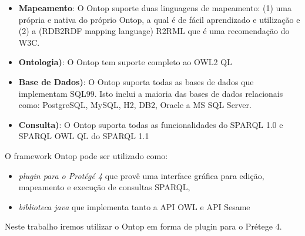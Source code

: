 \begin{itemize}

    \item \textbf{Mapeamento}: O Ontop suporte duas linguagens de mapeamento:
    (1) uma própria e nativa do próprio Ontop, a qual é de fácil aprendizado
    e utilização e (2) a (RDB2RDF mapping language) R2RML que é uma recomendação
    do W3C.

    \item \textbf{Ontologia)}: O Ontop tem suporte completo ao OWL2 QL

    \item \textbf{Base de Dados)}: O Ontop suporta todas as bases de dados que
    implementam SQL99. Isto inclui a maioria das bases de dados relacionais como:
    PostgreSQL, MySQL, H2, DB2, Oracle a MS SQL Server.

    \item \textbf{Consulta)}: O Ontop suporta todas as funcionalidades do SPARQL
    1.0 e SPARQL OWL QL do SPARQL 1.1

\end{itemize}

O framework Ontop pode ser utilizado como:

\begin{itemize}

    \item \textit{plugin para o Protégé 4} que provê uma interface gráfica para
    edição, mapeamento e execução de consultas SPARQL,

    \item \textit{biblioteca java} que implementa tanto a API OWL e API Sesame

\end{itemize}

Neste trabalho iremos utilizar o Ontop em forma de plugin para o Prétege 4.
